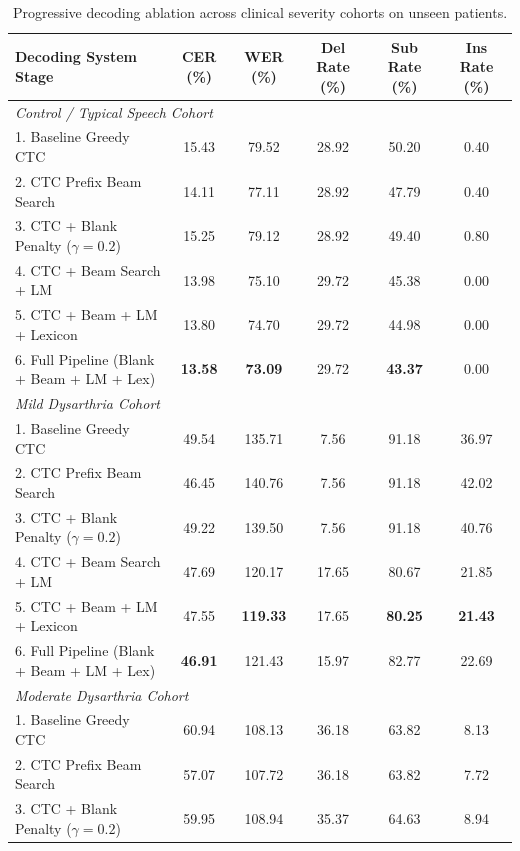 \documentclass[10pt,twocolumn]{article}
\makeatletter
\newenvironment{adjustbox}[1]{%
  \begin{lrbox}{\@adjbox}%
}{%
  \end{lrbox}%
  \resizebox{\linewidth}{!}{\usebox{\@adjbox}}%
}
\makeatother
\begin{document}
\begin{table}[!t]
\centering
\caption{Progressive decoding ablation across clinical severity cohorts on unseen patients.}
\label{tab:progressive_decoding}
\begin{adjustbox}{width=\textwidth}
\begin{tabular}{lccccc}
\toprule
\textbf{Decoding System Stage} & \textbf{CER (\%)} & \textbf{WER (\%)} & \textbf{Del Rate (\%)} & \textbf{Sub Rate (\%)} & \textbf{Ins Rate (\%)} \\
\midrule
\multicolumn{6}{l}{\textit{Control / Typical Speech Cohort}} \\
1. Baseline Greedy CTC & 15.43 & 79.52 & 28.92 & 50.20 & 0.40 \\
2. CTC Prefix Beam Search & 14.11 & 77.11 & 28.92 & 47.79 & 0.40 \\
3. CTC + Blank Penalty ($\gamma=0.2$) & 15.25 & 79.12 & 28.92 & 49.40 & 0.80 \\
4. CTC + Beam Search + LM & 13.98 & 75.10 & 29.72 & 45.38 & 0.00 \\
5. CTC + Beam + LM + Lexicon & 13.80 & 74.70 & 29.72 & 44.98 & 0.00 \\
6. Full Pipeline (Blank + Beam + LM + Lex) & \textbf{13.58} & \textbf{73.09} & 29.72 & \textbf{43.37} & 0.00 \\
\midrule
\multicolumn{6}{l}{\textit{Mild Dysarthria Cohort}} \\
1. Baseline Greedy CTC & 49.54 & 135.71 & 7.56 & 91.18 & 36.97 \\
2. CTC Prefix Beam Search & 46.45 & 140.76 & 7.56 & 91.18 & 42.02 \\
3. CTC + Blank Penalty ($\gamma=0.2$) & 49.22 & 139.50 & 7.56 & 91.18 & 40.76 \\
4. CTC + Beam Search + LM & 47.69 & 120.17 & 17.65 & 80.67 & 21.85 \\
5. CTC + Beam + LM + Lexicon & 47.55 & \textbf{119.33} & 17.65 & \textbf{80.25} & \textbf{21.43} \\
6. Full Pipeline (Blank + Beam + LM + Lex) & \textbf{46.91} & 121.43 & 15.97 & 82.77 & 22.69 \\
\midrule
\multicolumn{6}{l}{\textit{Moderate Dysarthria Cohort}} \\
1. Baseline Greedy CTC & 60.94 & 108.13 & 36.18 & 63.82 & 8.13 \\
2. CTC Prefix Beam Search & 57.07 & 107.72 & 36.18 & 63.82 & 7.72 \\
3. CTC + Blank Penalty ($\gamma=0.2$) & 59.95 & 108.94 & 35.37 & 64.63 & 8.94 \\

\end{tabular}
\end{adjustbox}
\end{table}
\end{document}
